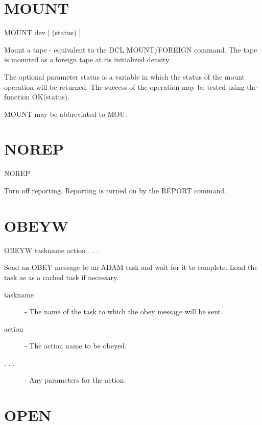 \documentclass[twoside,11pt,nolof,chapters]{starlink}
\begin{document}
\section{MOUNT\label{MOUNT}}

    MOUNT \hspace{.5cm} dev \hspace{.5cm} [ (status) ]

 Mount a tape - equivalent to the DCL MOUNT/FOREIGN command. The tape
 is mounted as a foreign tape at its initialized density.

 The optional parameter status is a variable in which the status of
 the mount operation will be returned. The success of the operation
 may be tested using the function OK(status).

 MOUNT may be abbreviated to MOU.

\section{NOREP\label{NOREP}}

   NOREP

Turn off reporting. Reporting is turned on by the REPORT command.



\section{OBEYW\label{OBEYW}}

    OBEYW \hspace{.5cm} taskname \hspace{.5cm} action  . . .

 Send an OBEY message to an ADAM task and wait for it to complete. Load the
 task as as a cached task if necessary.

\begin{description}

 \item[taskname] - The name of the task to which the obey message will be sent.

 \item[action] - The action name to be obeyed.

 \item[. . .] - Any parameters for the action.

\end{description}

\section{OPEN\label{OPEN}}
\end{document}
